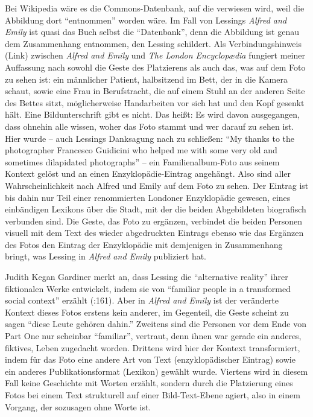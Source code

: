 \documentclass[fontsize=12pt]{scrartcl}
\begin{document}
Bei Wi\-ki\-pe\-dia w\"are es die Commons-Datenbank, auf die verwiesen wird, weil die Abbildung dort "`entnommen"' worden w\"are. Im Fall von Lessings \textit{Alfred and Emily} ist quasi das Buch \mbox{selbst} die "`Datenbank"', denn die Abbildung ist genau dem Zusammenhang entnommen, den Lessing schildert. Als Verbindungshinweis (Link) zwischen \textit{Alfred and Emily} und \textit{The London Encyclop{\ae}dia} fungiert meiner Auffassung nach sowohl die Geste des Platzierens als auch das, was auf dem Foto zu sehen ist: ein m\"annlicher Patient, halbsitzend im Bett, der in die Kamera schaut, sowie eine Frau in Berufstracht, die auf einem Stuhl an der anderen Seite des Bettes sitzt, m\"oglicherweise Handarbei\-ten vor sich hat und den Kopf gesenkt h\"alt. Eine Bildunterschrift gibt es nicht. Das hei{\ss}t: Es wird davon ausgegangen, dass ohnehin alle wissen, woher das Foto stammt und wer darauf zu sehen ist. \mbox{Hier} wurde -- auch Lessings Danksagung nach zu schlie{\ss}en: "`My thanks to the photographer Francesco Guidicini who helped me with some very old and sometimes dilapidated photographs"' -- ein Familienalbum-Foto aus seinem Kontext gel\"ost und an einen Enzyklop\"adie-Eintrag angeh\"angt. Also sind aller Wahrscheinlichkeit nach Alfred und Emily auf dem Foto zu sehen. Der Eintrag ist bis dahin nur Teil einer renommierten Londoner Enzyklop\"adie gewesen, eines einb\"andigen Lexikons \"uber die Stadt, mit der die beiden Abgebildeten biografisch verbunden sind. Die Geste, das Foto zu erg\"anzen, verbindet die beiden Per\-so\-nen visuell mit dem Text des wieder abgedruckten Eintrags ebenso wie das Erg\"anzen des Fotos den Eintrag der Enzyklop\"adie mit demjenigen in Zusammenhang bringt, was Lessing in \textit{Alfred and Emily} pu\-bli\-ziert hat. 

Judith Kegan Gardiner merkt an, dass Lessing die "`alternative reality"' ihrer fiktionalen Werke ent\-wickelt, indem sie von "`familiar people in a transformed social context"' erz\"ahlt (\cite{Gardiner2009}:161). Aber in \textit{Alfred and Emily} ist der ver\"anderte Kontext dieses Fotos erstens kein an\-de\-rer, im Gegenteil, die Geste scheint zu sagen "`diese Leute geh\"oren dahin."' Zwei\-tens sind die Per\-so\-nen vor dem Ende von Part One nur scheinbar "`fami\-liar"', vertraut, denn ihnen war gerade ein anderes, fiktives, Leben zugedacht worden. Drittens wird \mbox{hier} der Kontext transformiert, indem f\"ur das Foto eine andere Art von Text (enzyklop\"adischer Eintrag) sowie ein anderes Publikationsformat (Lexikon) gew\"ahlt wurde. Viertens wird in diesem Fall keine Geschichte mit Worten erz\"ahlt, sondern durch die Platzierung eines Fotos bei einem Text strukturell auf einer Bild-Text-Ebene agiert, also in einem Vorgang, der sozusagen ohne Worte ist. 
\end{document}
